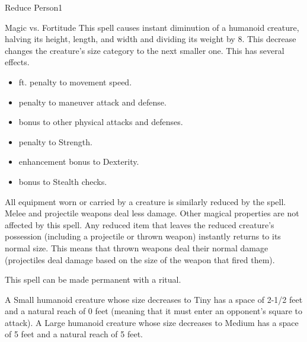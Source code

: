 \begin{spellsection}{Reduce Person}{1}
\begin{spellheader}
\end{spellheader}
\begin{spellcontent}
    \begin{spelltargetinginfo}
    \end{spelltargetinginfo}
    \begin{spelleffects}
        \begin{spellattack}{Magic vs. Fortitude}
            \spellsuccess This spell causes instant diminution of a humanoid creature, halving its height, length, and width and dividing its weight by 8. This decrease changes the creature's size category to the next smaller one. This has several effects.
            \begin{itemize} 
                \item {} ft. penalty to movement speed.
                \item {} penalty to maneuver attack and defense.
                \item {} bonus to other physical attacks and defenses.
                \item {} penalty to Strength.
                \item {} enhancement bonus to Dexterity.
                \item {} bonus to Stealth checks.
            \end{itemize}
            \par All equipment worn or carried by a creature is similarly reduced by the spell. Melee and projectile weapons deal less damage. Other magical properties are not affected by this spell. Any reduced item that leaves the reduced creature's possession (including a projectile or thrown weapon) instantly returns to its normal size. This means that thrown weapons deal their normal damage (projectiles deal damage based on the size of the weapon that fired them).
        \end{spellattack}
        \spelldur \durshort \dismissable
    \end{spelleffects}
\end{spellcontent}
\begin{spellfooter}
    \spellnotes \sizingspellnotes This spell can be made permanent with a  ritual.
    \par A Small humanoid creature whose size decreases to Tiny has a space of 2-1/2 feet and a natural reach of 0 feet (meaning that it must enter an opponent's square to attack). A Large humanoid creature whose size decreases to Medium has a space of 5 feet and a natural reach of 5 feet.
\end{spellfooter}
\end{spellsection}

